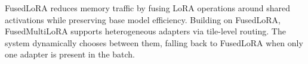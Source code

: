 FusedLoRA reduces memory traffic by fusing LoRA operations around shared activations while preserving base model efficiency. Building on FusedLoRA, FusedMultiLoRA supports heterogeneous adapters via tile-level routing. The system dynamically chooses between them, falling back to FusedLoRA when only one adapter is present in the batch.